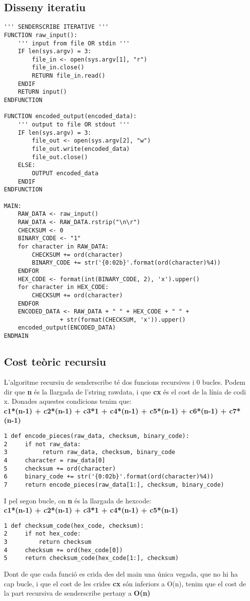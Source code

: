 \documentclass{article}
\begin{document}
\subsection{Disseny iteratiu}
\begin{lstlisting}
''' SENDERSCRIBE ITERATIVE '''
FUNCTION raw_input():
    ''' input from file OR stdin '''
    IF len(sys.argv) = 3:
        file_in <- open(sys.argv[1], "r")
        file_in.close()
        RETURN file_in.read()
    ENDIF
    RETURN input()
ENDFUNCTION

FUNCTION encoded_output(encoded_data):
    ''' output to file OR stdout '''
    IF len(sys.argv) = 3:
        file_out <- open(sys.argv[2], "w")
        file_out.write(encoded_data)
        file_out.close()
    ELSE:
        OUTPUT encoded_data
    ENDIF
ENDFUNCTION

MAIN:
    RAW_DATA <- raw_input()
    RAW_DATA <- RAW_DATA.rstrip("\n\r")
    CHECKSUM <- 0
    BINARY_CODE <- "1"
    for character in RAW_DATA:
        CHECKSUM += ord(character)
        BINARY_CODE += str('{0:02b}'.format(ord(character)%4))
    ENDFOR
    HEX_CODE <- format(int(BINARY_CODE, 2), 'x').upper()
    for character in HEX_CODE:
        CHECKSUM += ord(character)
    ENDFOR
    ENCODED_DATA <- RAW_DATA + " " + HEX_CODE + " " + 
				+ str(format(CHECKSUM, 'x')).upper()
    encoded_output(ENCODED_DATA)
ENDMAIN
\end{lstlisting}
\newpage
\subsection{Cost teòric recursiu}
L'algoritme recursiu de senderscribe té dos funcions recursives i 0 bucles.
Podem dir que \textbf{n} és la llargada de l'string raw\textunderscore data, 
i que \textbf{cx} és el cost de la línia de codi x. Donades aquestes 
condicions tenim que:\\
\textbf{c1*(n-1) + c2*(n-1) + c3*1 + c4*(n-1) + c5*(n-1) + c6*(n-1) + c7*(n-1)}
\begin{lstlisting}
1 def encode_pieces(raw_data, checksum, binary_code):
2     if not raw_data:
3          return raw_data, checksum, binary_code
4     character = raw_data[0]
5     checksum += ord(character)
6     binary_code += str('{0:02b}'.format(ord(character)%4))
7     return encode_pieces(raw_data[1:], checksum, binary_code)
\end{lstlisting}
I pel segon bucle, on \textbf{n} és la llargada de hex\textunderscore code:\\
\textbf{c1*(n-1) + c2*(n-1) + c3*1 + c4*(n-1) + c5*(n-1)}
\begin{lstlisting}
1 def checksum_code(hex_code, checksum):
2     if not hex_code:
3         return checksum
4     checksum += ord(hex_code[0])
5     return checksum_code(hex_code[1:], checksum)
\end{lstlisting}
Dont de que cada funció es crida des del main una única vegada, que no
hi ha cap bucle, i que el cost de les crides \textbf{cx} són inferiors
a O(n), tenim que el cost de la part recursiva de senderscribe pertany
a \textbf{O(n)}
\end{document}
